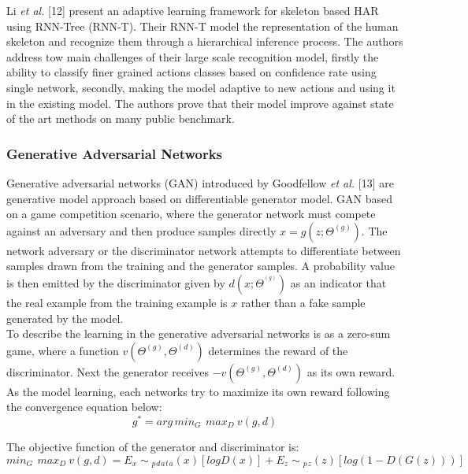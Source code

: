 \hspace{5mm} Li \textit{et al.} [12] present an adaptive learning framework for skeleton based HAR using RNN-Tree (RNN-T). Their RNN-T model the representation of the human skeleton and recognize them through a hierarchical inference process. The authors address tow main challenges of their large scale recognition model, firstly the ability to classify finer grained actions classes based on confidence rate using single network, secondly, making the model adaptive to new actions and using it in the existing model. The authors prove that their model improve against state of the art methods on many public benchmark.

\subsubsection{Generative Adversarial Networks}
\hspace{5mm} Generative adversarial networks (GAN) introduced by Goodfellow \textit{et al.} [13] are generative model approach based on differentiable generator model. GAN based on a game competition scenario, where the generator network must compete against an adversary and then produce samples directly $x = g(z;\Theta ^{(g)})$. The network adversary or the discriminator network attempts to differentiate between samples drawn from the training and the generator samples. A probability value is then emitted by the discriminator given by $d(x;\Theta ^{^{(g)}})$ as an indicator that the real example from the training example is $x$ rather than a fake sample generated by the model.\\

To describe the learning in the generative adversarial networks is as a zero-sum game, where a function $v(\Theta ^{(g)},\Theta ^{(d)})$ determines the reward of the discriminator. Next the generator receives $-v(\Theta ^{(g)},\Theta ^{(d)})$ as its own reward. As the model learning, each networks try to maximize its own reward following the convergence equation below:
\begin{equation}
    g^{*} = arg\,min{_G}\,\: max{_D}\: v(g,d)
\end{equation}

The objective function of the generator and discriminator is:
\begin{equation}
    min{_G}\,\: max{_D}\: v(g,d) = E{_x\sim {_p{_d}{_a}{_t}{_a}(x)}}[logD(x)] + E{_z\sim {_p}{_z}(z)}[{log(1 - D(G(z)))}]
\end{equation}

